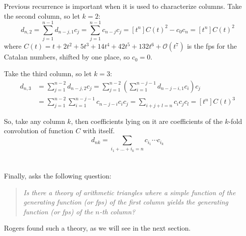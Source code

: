 Previous recurrence is important when it is used to characterize columns. Take the second
column, so let $k=2$:
\begin{displaymath}
    d_{n,2}=\sum_{j=1}^{n-1}{d_{n-j,1}c_{j}}
           =\sum_{j=1}^{n-1}{c_{n-j}c_{j}}
           =[t^{n}]C(t)^{2}-c_{0}c_{n}
           =[t^{n}]C(t)^{2}
\end{displaymath}
where $C(t)=t+2t^{2}+5t^{3}+14t^{4}+42t^{5}+132t^{6}+\mathcal{O}(t^{7})$ is the
\ac{fps} for the Catalan numbers, shifted by one place, so $c_{0}=0$.

Take the third column, so let $k=3$:
\begin{displaymath}
    \begin{split}
        d_{n,3}&=\sum_{j=1}^{n-2}{d_{n-j,2}c_{j}}
               =\sum_{j=1}^{n-2}{\left(\sum_{i=1}^{n-j-1}{d_{n-j-i,1}c_{i}}\right)c_{j}}\\
               &=\sum_{j=1}^{n-2}{\sum_{i=1}^{n-j-1}{c_{n-j-i}c_{i}}c_{j}}
               =\sum_{i+j+l=n}{c_{i}c_{j}c_{l}}
               =[t^{n}]C(t)^{3}
    \end{split}
\end{displaymath}

So, take any column $k$, then coefficients lying on it are coefficients
of the $k$-fold convolution of function $C$ with itself.
\begin{equation}
    d_{nk}=\sum_{i_{1}+\ldots+i_{k}=n}{c_{i_{1}}\cdots c_{i_{k}}}
    \label{eq:shapiro:catalan:triangle:convolution:for:generic:coefficient}
\end{equation}
\\\\
Finally, \citeauthor{shapiro:1976} asks the following question:
\begin{quote}
    \emph{Is there a theory of arithmetic triangles where a simple function
    of the generating function (or \ac{fps}) of the first column yields
    the generating function (or \ac{fps}) of the $n$-th column?}
\end{quote}
Rogers found such a theory, as we will see in the next section.










